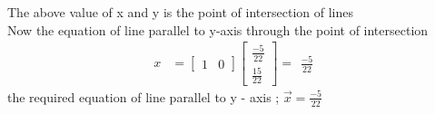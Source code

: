 \documentclass{article}
\begin{document}
The above value of x and y is the point of intersection of lines \\
Now the equation of line parallel to y-axis through the point of intersection
\begin{align*}
     x & = \left[\begin{array}{cc}
{1} & {0}
 \end{array}
            \right]\left[\begin{array}{cc}
             \frac{-5}{22}
             \\
              \frac{15}{22}                 
               \end{array}
                \right]
                 = \begin{array}{cc}
                    \frac{-5}{22}
                    \end{array}
\end{align*}
the required equation of line parallel to y - axis ;
\begin{math}
\vec{x} =\frac{-5}{22}
 \end{math}
\end{document}
